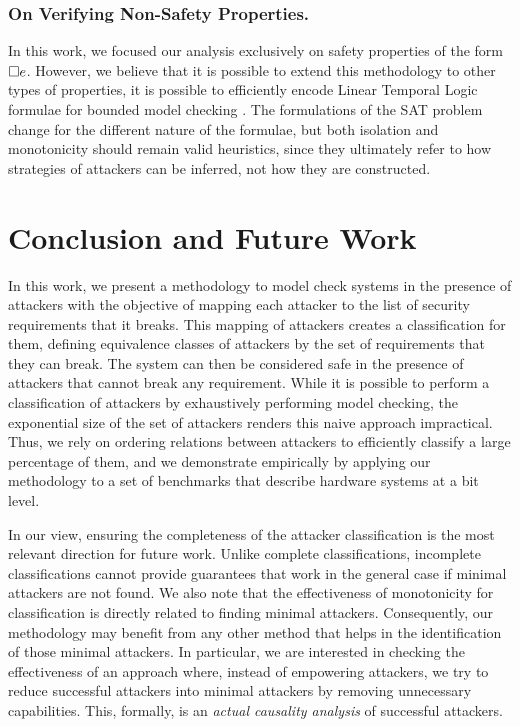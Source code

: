 {\subsubsection{On Verifying Non-Safety Properties.} In this work, we focused our analysis exclusively on safety properties of the form ${{\square}} e$. However, we believe that it is possible to extend this methodology to other types of properties, it is possible to efficiently encode Linear Temporal Logic formulae for bounded model checking \cite{BMCWithoutBDDs,lmcs:2236}. The formulations of the SAT problem change for the different nature of the formulae, but both isolation and monotonicity should remain valid heuristics, since they ultimately refer to how strategies of attackers can be inferred, not how they are constructed.  

\section{Conclusion and Future Work}
\label{sec:conclusion}
In this work, we present a methodology to model check systems in the presence of attackers with the objective of mapping each attacker to the list of security requirements that it breaks. This mapping of attackers creates a classification for them, defining equivalence classes of attackers by the set of requirements that they can break. The system can then be considered safe in the presence of attackers that cannot break any requirement. While it is possible to perform a classification of attackers by exhaustively performing model checking, the exponential size of the set of attackers renders this naive approach impractical. Thus, we rely on ordering relations between attackers to efficiently classify a large percentage of them, and we demonstrate empirically by applying our methodology to a set of benchmarks that describe hardware systems at a bit level.

In our view, ensuring the completeness of the attacker classification is the most relevant direction for future work. Unlike complete classifications, incomplete classifications cannot provide guarantees that work in the general case if minimal attackers are not found. We also note that the effectiveness of monotonicity for classification is directly related to finding minimal attackers. Consequently, our methodology may benefit from any other method that helps in the identification of those minimal attackers. In particular, we are interested in checking the effectiveness of an approach where, instead of empowering attackers, we try to {reduce} successful attackers into minimal attackers by removing unnecessary capabilities. This, formally, is an \emph{actual causality analysis} \cite{ActualCausality} of successful attackers.
}
